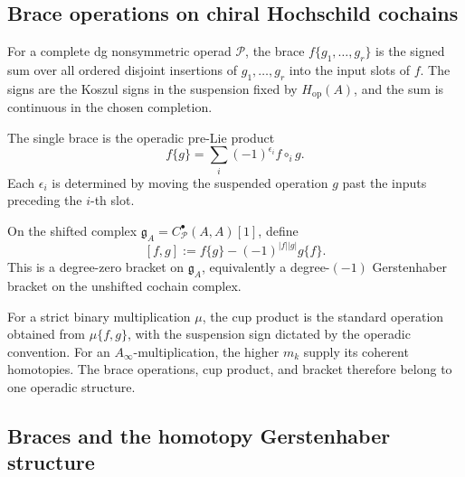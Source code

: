 \subsection{Brace operations on chiral Hochschild cochains}
\label{subsec:brace-ops-chiral}

\begin{definition}
\label{def:brace-operations-chiral}
For a complete dg nonsymmetric operad \(\mathcal P\), the brace
\(f\{g_1,\ldots,g_r\}\) is the signed sum over all ordered disjoint
insertions of \(g_1,\ldots,g_r\) into the input slots of \(f\).
The signs are the Koszul signs in the suspension fixed by
\(H_{\mathrm{op}}(A)\), and the sum is continuous in the chosen
completion.
\end{definition}

\begin{example}
\label{ex:single-brace-chiral}
The single brace is the operadic pre-Lie product
\[
 f\{g\}=\sum_i (-1)^{\epsilon_i}f\circ_i g.
\]
Each \(\epsilon_i\) is determined by moving the suspended operation
\(g\) past the inputs preceding the \(i\)-th slot.
\end{example}

\begin{definition}
\label{def:gerstenhaber-bracket-chiral}
On the shifted complex
\(\mathfrak g_A=C^\bullet_{\mathcal P}(A,A)[1]\), define
\[
 [f,g]
 :=
 f\{g\}-(-1)^{|f||g|}g\{f\}.
\]
This is a degree-zero bracket on \(\mathfrak g_A\), equivalently a
degree-\((-1)\) Gerstenhaber bracket on the unshifted cochain complex.
\end{definition}

\begin{remark}
\label{rem:cup-product}
For a strict binary multiplication \(\mu\), the cup product is the
standard operation obtained from \(\mu\{\!f,g\!\}\), with the
suspension sign dictated by the operadic convention.  For an
\(A_\infty\)-multiplication, the higher \(m_k\) supply its coherent
homotopies.  The brace operations, cup product, and bracket therefore
belong to one operadic structure.
\end{remark}

\subsection{Braces and the homotopy Gerstenhaber structure}
\label{subsec:brace-dg-algebra}

